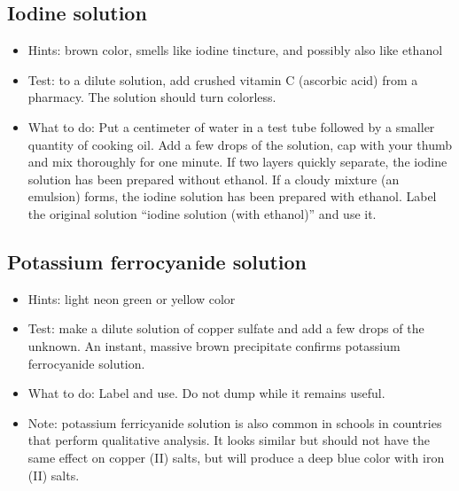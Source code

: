 \subsection{Iodine solution}

\begin{itemize}

\item{Hints: brown color, 
smells like iodine tincture, 
and possibly also like ethanol}

\item{Test: to a dilute solution, 
add crushed vitamin C (ascorbic acid) from a pharmacy. 
The solution should turn colorless.}

\item{What to do: Put a centimeter of water in a test tube 
followed by a smaller quantity of cooking oil. 
Add a few drops of the solution, 
cap with your thumb and mix thoroughly for one minute. 
If two layers quickly separate, 
the iodine solution has been prepared without ethanol. 
If a cloudy mixture (an emulsion) forms, 
the iodine solution has been prepared with ethanol. 
Label the original solution ``iodine solution (with ethanol)'' and use it.}

\end{itemize}

\subsection{Potassium ferrocyanide solution}

\begin{itemize}

\item{Hints: light neon green or yellow color}

\item{Test: make a dilute solution of copper sulfate and add a few drops of the unknown. 
An instant, 
massive brown precipitate confirms potassium ferrocyanide solution.}

\item{What to do: Label and use. 
Do not dump while it remains useful.}

\item{Note: potassium ferricyanide solution is also common in schools 
in countries that perform qualitative analysis. 
It looks similar but should not have the same effect on copper (II) salts, 
but will produce a deep blue color with iron (II) salts.}


\end{itemize}

